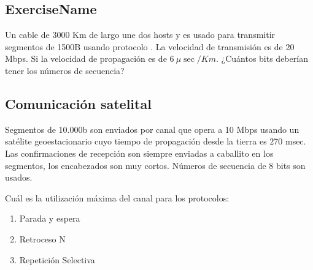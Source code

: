 \documentclass[12pt]{report}
\begin{document}
\begin{exer}
\subsection{ExerciseName \sfour}
Un cable de 3000 Km de largo une dos hosts y es usado para transmitir segmentos de
1500B usando protocolo . La velocidad de transmisión es de 20 Mbps. Si la
velocidad de propagación es de $6\ \mu \sec/Km$. ¿Cuántos bits deberían tener los números de secuencia?
\end{exer}

\begin{exer}
\subsection{Comunicación satelital \sthree}
Segmentos de 10.000b son enviados por canal que opera a 10 Mbps usando un
satélite geoestacionario cuyo tiempo de propagación desde la tierra es 270 msec. Las
confirmaciones de recepción son siempre enviadas a caballito en los segmentos, los encabezados
son muy cortos.
Números de secuencia de 8 bits son usados.

Cuál es la utilización máxima del canal para los protocolos:
\begin{enumerate}
\item Parada y espera
\item Retroceso N
\item Repetición Selectiva
\end{enumerate}
\end{exer}
\end{document}
